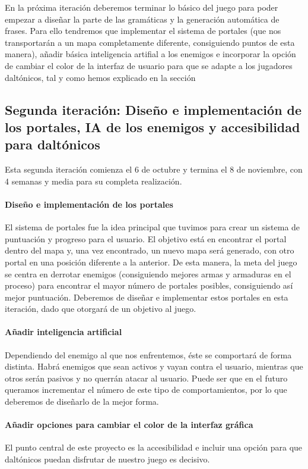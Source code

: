 En la próxima iteración deberemos terminar lo básico del juego para poder empezar a diseñar la parte de las gramáticas y la generación automática de frases. Para ello tendremos que implementar el sistema de portales (que nos transportarán a un mapa completamente diferente, consiguiendo puntos de esta manera), añadir básica inteligencia artifial a los enemigos e incorporar la opción de cambiar el color de la interfaz de usuario para que se adapte a los jugadores daltónicos, tal y como hemos explicado en la sección \label{sec:daltonicossolventar}

\subsection{Segunda iteración: Diseño e implementación de los portales, IA de los enemigos y accesibilidad para daltónicos}

Esta segunda iteración comienza el 6 de octubre y termina el 8 de noviembre, con 4 semanas y media para su completa realización.

\paragraph{Diseño e implementación de los portales} El sistema de portales fue la idea principal que tuvimos para crear un sistema de puntuación y progreso para el usuario. El objetivo está en encontrar el portal dentro del mapa y, una vez encontrado, un nuevo mapa será generado, con otro portal en una posición diferente a la anterior. De esta manera, la meta del juego se centra en derrotar enemigos (consiguiendo mejores armas y armaduras en el proceso) para encontrar el mayor número de portales posibles, consiguiendo así mejor puntuación.
Deberemos de diseñar e implementar estos portales en esta iteración, dado que otorgará de un objetivo al juego.

\paragraph{Añadir inteligencia artificial} Dependiendo del enemigo al que nos enfrentemos, éste se comportará de forma distinta. Habrá enemigos que sean activos y vayan contra el usuario, mientras que otros serán pasivos y no querrán atacar al usuario. Puede ser que en el futuro queramos incrementar el número de este tipo de comportamientos, por lo que deberemos de diseñarlo de la mejor forma.

\paragraph{Añadir opciones para cambiar el color de la interfaz gráfica} El punto central de este proyecto es la accesibilidad e incluir una opción para que daltónicos puedan disfrutar de nuestro juego es decisivo.

